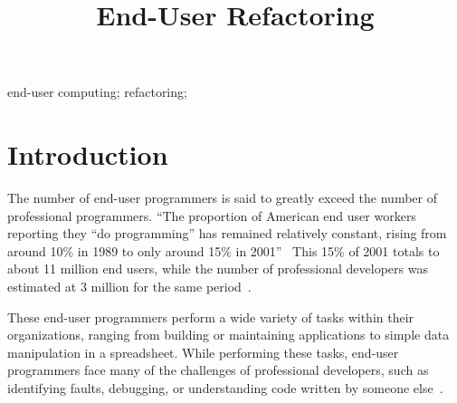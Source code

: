 \documentclass[10pt,conference,compsocconf]{IEEEtran}
\begin{document}
%
\title{End-User Refactoring}

\author{


\and
{}
}

\maketitle

\begin{abstract}
\end{abstract}


\begin{IEEEkeywords}
end-user computing; refactoring; 
\end{IEEEkeywords}

\section{Introduction}
The number of end-user programmers is said to greatly exceed the number of professional programmers. ``The proportion of American end user workers reporting they ``do programming'' has remained relatively constant, rising from around 10\% in 1989 to only around 15\% in 2001''~\cite{Scaf2005} This 15\% of 2001 totals to about 11 million end users, while the number of professional developers was estimated at 3 million for the same period~\cite{Scaf2005}.

These end-user programmers perform a wide variety of tasks within their organizations, ranging from building or maintaining applications to simple data manipulation in a spreadsheet. While performing these tasks, end-user programmers face many of the challenges of professional developers, such as identifying faults, debugging, or understanding code written by someone else~\cite{Ko2011}.
\end{document}
